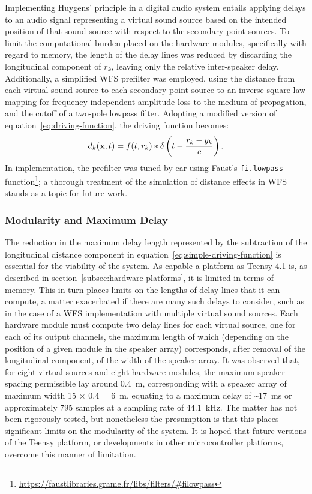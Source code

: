 Implementing Huygens' principle in a digital audio system entails applying
delays to an audio signal representing a virtual sound source based on the
intended position of that sound source with respect to the secondary point
sources.
To limit the computational burden placed on the hardware modules, specifically
with regard to memory, the length of the delay lines was reduced by discarding
the longitudinal component of $r_k$, leaving only the relative inter-speaker
delay.
Additionally, a simplified WFS prefilter was employed, using the distance
from each virtual sound source to each secondary point source to an inverse
square law mapping for frequency-independent amplitude loss to the medium of
propagation, and the cutoff of a two-pole lowpass filter.
Adopting a modified version of equation~\eqref{eq:driving-function}, the
driving function becomes:
\begin{equation}
    \label{eq:simple-driving-function}
    d_k(\mathbf{x},t) = f(t, r_k) \ast \delta\left(t - \frac{r_k-y_k}{c}\right).
\end{equation}
In implementation, the prefilter was tuned by ear using Faust's
\texttt{fi.lowpass} function\footnote{
    \url{https://faustlibraries.grame.fr/libs/filters/\#filowpass}
}; a thorough treatment of the simulation of distance effects in WFS stands as
a topic for future work.

\subsubsection{Modularity and Maximum Delay}

The reduction in the maximum delay length represented by the subtraction of
the longitudinal distance component in
equation~\eqref{eq:simple-driving-function} is essential for the viability of
the system.
As capable a platform as Teensy 4.1 is, as described in
section~\ref{subsec:hardware-platforms}, it is limited in terms of memory.
This in turn places limits on the lengths of delay lines that it can compute,
a matter exacerbated if there are many such delays to consider, such as in the
case of a WFS implementation with multiple virtual sound sources.
Each hardware module must compute two delay lines for each virtual source, one
for each of its output channels, the maximum length of which (depending on
the position of a given module in the speaker array) corresponds, after removal
of the longitudinal component, of the width of the speaker array.
It was observed that, for eight virtual sources and eight hardware modules,
the maximum speaker spacing permissible lay around \qty{.4}{\m},
corresponding with a speaker array of maximum width 15 $\times$ 0.4 =
\qty{6}{\m}, equating to a maximum delay of \textasciitilde\qty{17}{\ms} or
approximately 795 samples at a sampling rate of \qty{44.1}{\kHz}.
The matter has not been rigorously tested, but nonetheless the presumption is
that this places significant limits on the modularity of the system.
It is hoped that future versions of the Teensy platform, or developments in
other microcontroller platforms, overcome this manner of limitation.

